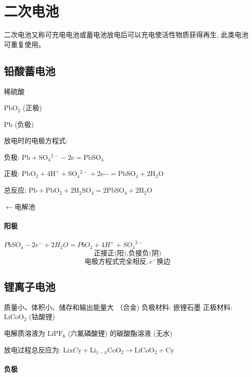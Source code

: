 \documentclass[10pt,cn]{elegantbook}
\begin{document}
\section{二次电池}

二次电池又称可充电电池或蓄电池放电后可以充电使活性物质获得再生, 此类电池可重复使用。

\subsection{铅酸蓄电池}

稀硫酸

\({\mathrm{{PbO}}}_{2}\) (正极)

\(\mathrm{{Pb}}\) (负极)

放电时的电极方程式:

负极: \(\mathrm{{Pb}} + {\mathrm{{SO}}}_{4}{}^{2 - } - 2\mathrm{e} = {\mathrm{{PbSO}}}_{4}\)

正极: \({\mathrm{{PbO}}}_{2} + 4{\mathrm{H}}^{ + } + {\mathrm{{SO}}}_{4}{}^{2 - } + 2\mathrm{e} - = {\mathrm{{PbSO}}}_{4} + 2{\mathrm{H}}_{2}\mathrm{O}\)

总反应: \(\mathrm{{Pb}} + {\mathrm{{PbO}}}_{2} + 2{\mathrm{H}}_{2}{\mathrm{{SO}}}_{4} = 2{\mathrm{{PbSO}}}_{4} + 2{\mathrm{H}}_{2}\mathrm{O}\)

$\longleftarrow$电解池

\paragraph*{阳极}

$PbSO_{4} - 2e^{-} +2H_{2}O = PbO_{2} + 4H^{+} + {SO_{4}}^{2-}$
	\[\mbox{正接正(阳),负接负(阴)}\]
	\[\mbox{电极方程式完全相反},e^{-}\mbox{换边}\]
	
\subsection{锂离子电池}

 质量小、体积小、储存和输出能量大 （合金)
负极材料: 嵌锂石墨 正极材料: \({\mathrm{{LiCoO}}}_{2}\) (钴酸锂)

电解质溶液为 \({\mathrm{{LiPF}}}_{6}\) (六氟磷酸锂) 的碳酸酯溶液 (无水)

放电过程总反应为: \({\mathrm{{Lix}}}C\mathrm{y} + {\mathrm{{Li}}}_{1 - \mathrm{x}}{\mathrm{{CoO}}}_{2} \rightarrow {\mathrm{{LiCoO}}}_{2} + \mathrm{{Cy}}\)


\paragraph*{负极}
\end{document}
